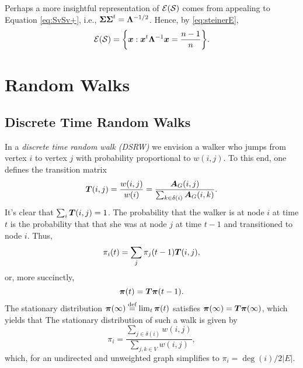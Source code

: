 Perhaps a more insightful representation of $\mathcal{E}(\mathcal{S})$ comes from appealing to Equation \eqref{eq:SvSv+}, i.e., $\boldsymbol{\Sigma}\boldsymbol{\Sigma}^t = \vb{\Lambda}^{-1/2}$. Hence, by \eqref{eq:steinerE},
\begin{equation}
\label{eq:steinerE2}
    \mathcal{E}(\mathcal{S}) = \bigg\{\vb*{x}:\vb*{x}^t \vb{\Lambda}^{-1}\vb*{x} = \frac{n-1}{n}\bigg\}.
\end{equation}







\section{Random Walks}



\subsection{Discrete Time Random Walks}
In a \emph{discrete time random walk (DSRW)} we envision a walker who jumps from vertex $i$ to vertex $j$ with probability proportional to $w(i,j)$. To this end, one defines the transition matrix 
\begin{equation*}
    \vb*{T}(i,j) = \frac{w(i,j)}{w(i)}=\frac{\vb*{A}_G(i,j)}{\sum_{k\in\delta(i)} \vb*{A}_G(i,k)}.
\end{equation*}
It's clear that $\sum_i \vb*{T}(i,j)=1$. 
The probability that the walker is at node $i$ at time $t$ is the probability that that she was at node $j$ at time $t-1$ and transitioned to node $i$. Thus, 
\begin{equation*}
    \pi_i(t)=\sum_{j}\pi_j(t-1)\vb*{T}(i,j),
\end{equation*}
or, more succinctly, 
\begin{equation*}
    \boldsymbol{\pi}(t) = \vb*{T}\boldsymbol{\pi}(t-1).
\end{equation*}
The stationary distribution $\boldsymbol{\pi}(\infty)\overset{\text{def}}{=} \lim_t \boldsymbol{\pi}(t)$  satisfies $\boldsymbol{\pi}(\infty)=\vb*{T}\boldsymbol{\pi}(\infty)$,  which yields that 
The stationary distribution of such a walk is given by 
\[\pi_i = \frac{\sum_{j\in \delta(i)} w(i,j)}{\sum_{j,k\in V}w(i,j)},\]
which, for an undirected and unweighted graph simplifies to $\pi_i=\deg(i)/2|E|$. 


